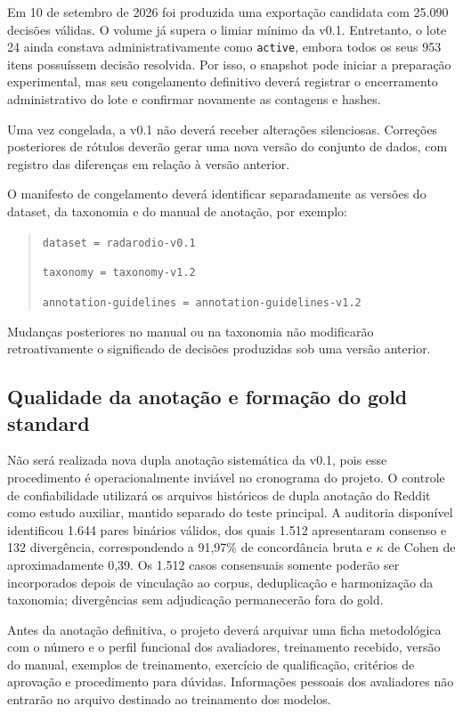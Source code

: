 Em 10 de setembro de 2026 foi produzida uma exportação candidata com 25.090
decisões válidas. O volume já supera o limiar mínimo da v0.1. Entretanto, o lote
24 ainda constava administrativamente como \texttt{active}, embora todos os seus
953 itens possuíssem decisão resolvida. Por isso, o snapshot pode iniciar a
preparação experimental, mas seu congelamento definitivo deverá registrar o
encerramento administrativo do lote e confirmar novamente as contagens e hashes.

Uma vez congelada, a v0.1 não deverá receber alterações silenciosas. Correções
posteriores de rótulos deverão gerar uma nova versão do conjunto de dados, com
registro das diferenças em relação à versão anterior.

O manifesto de congelamento deverá identificar separadamente as versões do
dataset, da taxonomia e do manual de anotação, por exemplo:

\begin{quote}
\texttt{dataset = radarodio-v0.1}\par
\texttt{taxonomy = taxonomy-v1.2}\par
\texttt{annotation-guidelines = annotation-guidelines-v1.2}
\end{quote}

Mudanças posteriores no manual ou na taxonomia não modificarão retroativamente
o significado de decisões produzidas sob uma versão anterior.

\subsection{Qualidade da anotação e formação do gold standard}
\label{sec:qualidade-anotacao}

Não será realizada nova dupla anotação sistemática da v0.1, pois esse procedimento
é operacionalmente inviável no cronograma do projeto. O controle de confiabilidade
utilizará os arquivos históricos de dupla anotação do Reddit como estudo auxiliar,
mantido separado do teste principal. A auditoria disponível identificou 1.644
pares binários válidos, dos quais 1.512 apresentaram consenso e 132 divergência,
correspondendo a 91,97\% de concordância bruta e $\kappa$ de Cohen de aproximadamente
0,39. Os 1.512 casos consensuais somente poderão ser incorporados depois de
vinculação ao corpus, deduplicação e harmonização da taxonomia; divergências sem
adjudicação permanecerão fora do gold.

Antes da anotação definitiva, o projeto deverá arquivar uma ficha metodológica
com o número e o perfil funcional dos avaliadores, treinamento recebido, versão
do manual, exemplos de treinamento, exercício de qualificação, critérios de
aprovação e procedimento para dúvidas. Informações pessoais dos avaliadores não
entrarão no arquivo destinado ao treinamento dos modelos.

